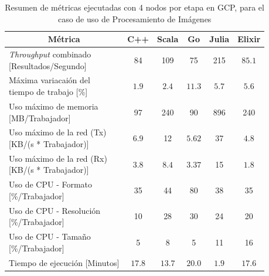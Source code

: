 \documentclass[11pt]{article}
\providecommand{\row}[1]{\parbox{150pt}{\setlength{\baselineskip}{0.2\baselineskip}\strut#1\strut}}
\newcommand{\english}[1]{\textit{#1}}
\begin{document}
\begin{table}[H]
\centering
\begin{tabular}{|l|c|c|c|c|c|}
\hline
\multicolumn{1}{|c|}{Métrica} & C++ & Scala & Go & Julia & Elixir \\ \hline
\row{\english{Throughput} combinado \\ {[Resultados/Segundo]}} & 84 & 109 & 75 & 215 & $85.1$ \\ \hline
\row{Máxima variacaión del \\ tiempo de trabajo {[}\%{]}} & $1.9$ & $2.4$ & $11.3$ & $5.7$ & $5.6$ \\ \hline
\row{Uso máximo de memoria \\ {[}MB/Trabajador{]}} & 97 & 240 & 90 & 896 & 240 \\ \hline
\row{Uso máximo de la red (Tx) \\ {[}KB/(s * Trabajador){]}} & $6.9$ & 12 & $5.62$ & 37 & $4.8$ \\ \hline
\row{Uso máximo de la red (Rx)\\ {[}KB/(s * Trabajador){]}} & $3.8$ & $8.4$ & $3.37$ & 15 & $1.8$ \\ \hline
\row{Uso de CPU - Formato \\ {[\%/Trabajador]}} & 35 & 44 & 80 & 38 & 35 \\ \hline
\row{Uso de CPU - Resolución \\ {[\%/Trabajador]}} & 10 & 28 & 30 & 24 & 20 \\ \hline
\row{Uso de CPU - Tamaño \\ {[\%/Trabajador]}} & 5 & 8 & 5 & 11 & 16 \\ \hline
Tiempo de ejecución {[}Minutos{]} & $17.8$ & $13.7$ & $20.0$ & $1.9$ & $17.6$ \\ \hline
\end{tabular}
\caption{Resumen de métricas ejecutadas con 4 nodos por etapa en GCP, para el caso de uso de Procesamiento de Imágenes}
\end{table}
\end{document}
